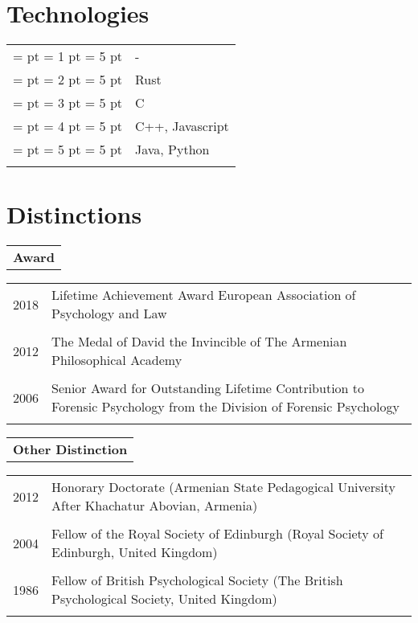 \documentclass [a4paper,10pt]{article}
\newcommand{\gradelong}[6]{%
    \pgfmathtruncatemacro\floored{#1}%
    \pgfmathsetmacro\diff{#1-\floored}%
    \newdimen\diffDim%
    \diffDim = \diff pt%
    \newdimen\numPointsDim
    \numPointsDim = #1 pt
    \newdimen\maxPointsDim%
    \maxPointsDim = #2 pt%
    \begin{tikzpicture}
        \foreach \x in {1, ..., #2}{
            \ifnum \x > \floored \relax%
                \def\fillCol{#6}%
            \else%
                \def\fillCol{#5}%
            \fi%
            \fill[\fillCol] (#3*\x, 0) circle (#4);
        }%
        \ifdim \diffDim > 0 pt \relax%
            \ifdim \numPointsDim > \maxPointsDim \relax%
            \else%
                \pgfmathsetmacro\pos{#3*(\floored+1)}%
                \begin{scope}[xshift=\pos]
                    \clip (-#4,-#4) rectangle ++(#4*2*\diff,#4*2);
                    \fill[#5] (0, 0) circle (#4);
                \end{scope}
            \fi%
        \else%
        \fi%
    \end{tikzpicture}%
}
\newcommand{\grade}[1]{%
    \gradelong%
    {#1}%
    {5}%
    {9pt}%
    {3pt}%
    {frontColor}%
    {backColor}%
}
\begin{document}
\section{Technologies}
\begin{tabular}{r p{11cm}}
\\
        \grade{1} & -\\
        \grade{2} & Rust\\
        \grade{3} & C\\
        \grade{4} & C++, Javascript \\
        \grade{5}  & Java, Python\\\\
\end{tabular}

\section{Distinctions}
\begin{tabular}{r}
\\\large
\textbf{Award}
\normalsize
\end{tabular}

\begin{tabular}{r p{11cm}}	
\\
\textsc{2018} & Lifetime Achievement Award European Association of Psychology and Law\\ \\
\textsc{2012} & The Medal of David the Invincible of The Armenian Philosophical Academy\\ \\
\textsc{2006} & 	Senior Award for Outstanding Lifetime Contribution to Forensic Psychology from the Division of Forensic Psychology\\ \\
\end{tabular}

\begin{tabular}{r}
\large
\textbf{Other Distinction}
\normalsize
\end{tabular}

\begin{tabular}{r p{11cm}}	
\\
\textsc{2012} & Honorary Doctorate (Armenian State Pedagogical University After Khachatur Abovian, Armenia)\\ \\
\textsc{2004} & Fellow of the Royal Society of Edinburgh (Royal Society of Edinburgh, United Kingdom)\\ \\
\textsc{1986} & Fellow of British Psychological Society (The British Psychological Society, United Kingdom)\\ \\
\end{tabular}
\end{document}
